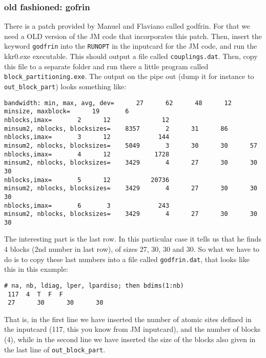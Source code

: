 \documentclass[11pt,fleqn]{book} %
\begin{document}
\subsubsection{old fashioned: gofrin}

There is
a patch provided by Manuel and Flaviano called godfrin. For that we need a OLD version of the JM
code that incorporates this patch. Then, insert the keyword \verb|godfrin| into the \verb|RUNOPT|
in the inputcard for the JM code, and run the kkr0.exe executable. This should output
a file called \verb|couplings.dat|. Then, copy this file to a separate folder and run there
a little program called  \verb|block_partitioning.exe|. The output on the pipe out (dump it for instance to
\verb|out_block_part|) looks something like:
\begin{VBox}
\begin{verbatim}
bandwidth: min, max, avg, dev=      27      62      48      12
minsize, maxblock=      19       6
nblocks,imax=       2      12              12
minsum2, nblocks, blocksizes=    8357       2      31      86
nblocks,imax=       3      12             144
minsum2, nblocks, blocksizes=    5049       3      30      30      57
nblocks,imax=       4      12            1728
minsum2, nblocks, blocksizes=    3429       4      27      30      30      30
nblocks,imax=       5      12           20736
minsum2, nblocks, blocksizes=    3429       4      27      30      30      30
nblocks,imax=       6       3             243
minsum2, nblocks, blocksizes=    3429       4      27      30      30      30
\end{verbatim}
\end{VBox}
The interesting part is the last row. In this particular case it tells us that he finds 4 blocks
(2nd number in last row), of sizes 27, 30, 30 and 30. So what we have to do is to copy these last numbers
into a file called \verb|godfrin.dat|, that looks like this in this example:
\begin{VBox}
\begin{verbatim}
# na, nb, ldiag, lper, lpardiso; then bdims(1:nb)
 117  4  T  F  F
 27      30      30      30
\end{verbatim}
\end{VBox}
That is, in the first line we have
inserted the number of atomic sites defined in the inputcard (117, this you know from
JM inputcard), and the number of blocks (4), while in the second line we have inserted
the size of the blocks also given in the last line of \verb|out_block_part|.
\end{document}
